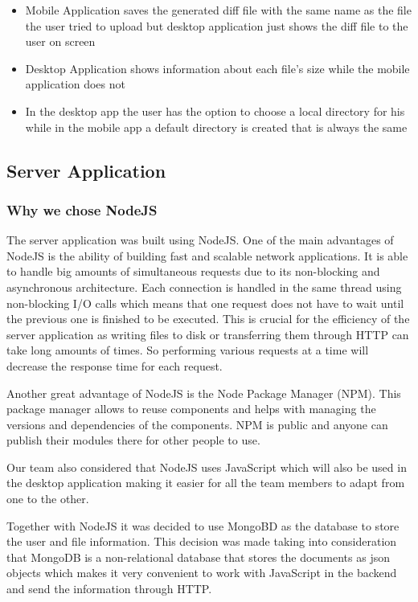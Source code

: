 \documentclass[11pt]{article}
\begin{document}
\begin{itemize}
	\item{Mobile Application saves the generated diff file with the same name as the file the user tried to upload but desktop application just shows the diff file to the user on screen}
	\item{Desktop Application shows information about each file’s size while the mobile application does not}
	\item{In the desktop app the user has the option to choose a local directory for his while in the mobile app a default directory is created that is always the same}
\end{itemize}

\subsection{Server Application}

\subsubsection*{Why we chose NodeJS}

The server application was built using NodeJS. One of the main advantages of NodeJS is the ability of building fast and scalable network applications. It is able to handle big amounts of simultaneous requests due to its non-blocking and asynchronous architecture. Each connection is handled in the same thread using non-blocking I/O calls which means that one request does not have to wait until the previous one is finished to be executed. This is crucial for the efficiency of the server application as writing files to disk or transferring them through HTTP can take long amounts of times. So performing various requests at a time will decrease the response time for each request.

Another great advantage of NodeJS is the Node Package Manager (NPM). This package manager allows to reuse components and helps with managing the versions and dependencies of the components. NPM is public and anyone can publish their modules there for other people to use.

Our team also considered that NodeJS uses JavaScript which will also be used in the desktop application making it easier for all the team members to adapt from one to the other.

Together with NodeJS it was decided to use MongoBD as the database to store the user and file information. This decision was made taking into consideration that MongoDB is a non-relational database that stores the documents as json objects which makes it very convenient to work with JavaScript in the backend and send the information through HTTP.
\end{document}
